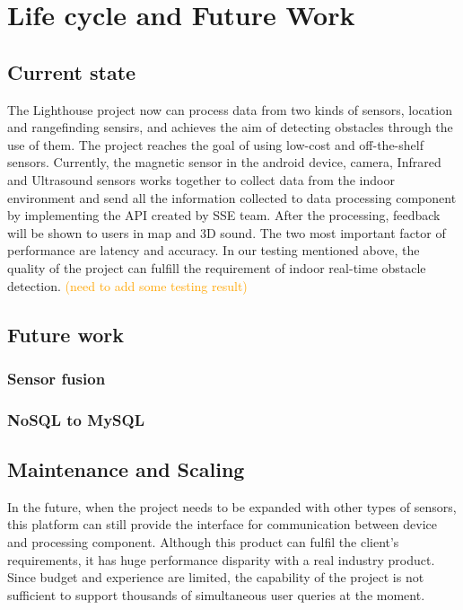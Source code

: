 \documentclass[prodmode,acmtosem]{acmsmall} %
\begin{document}
\section{Life cycle and Future Work}
\subsection{Current state}
The Lighthouse project now can process data from two kinds of sensors, location and rangefinding sensirs, and achieves the aim of detecting obstacles through the use of them. The project reaches the goal of using low-cost and off-the-shelf sensors. Currently, the magnetic sensor in the android device, camera, Infrared and Ultrasound sensors works together to collect data from the indoor environment and send all the information collected to data processing component by implementing the API created by SSE team. After the processing, feedback will be shown to users in map and 3D sound. The two most important factor of performance are latency and accuracy. In our testing mentioned above, the quality of the project can fulfill the requirement of indoor real-time obstacle detection.
\textcolor{orange}{(need to add some testing result)}

\subsection{Future work}

\subsubsection{Sensor fusion}

\subsubsection{NoSQL to MySQL}

\subsection{Maintenance and Scaling}
In the future, when the project needs to be expanded with other types of sensors, this platform can still provide the interface for communication between device and processing component. 
Although this product can fulfil the client's requirements, it has huge performance disparity with a real industry product. Since budget and experience are limited, the capability of the project is not sufficient to support thousands of simultaneous user queries at the moment.
\end{document}
